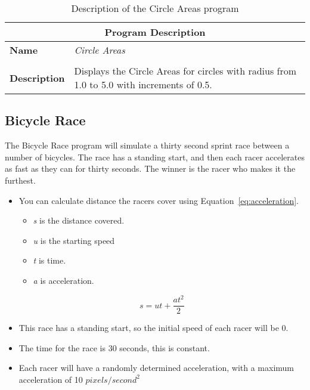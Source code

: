 \begin{table}[h]
\centering
\begin{tabular}{l|p{10cm}}
  \hline
  \multicolumn{2}{c}{\textbf{Program Description}} \\
  \hline
  \textbf{Name} & \emph{Circle Areas} \\
  \\
  \textbf{Description} & Displays the Circle Areas for circles with radius from 1.0 to 5.0 with increments of 0.5. \\
  \hline
\end{tabular}
\caption{Description of the Circle Areas program}
\label{tbl:data-circle-area}
\end{table}




\clearpage



\clearpage
\subsection{Bicycle Race} %
\label{sub:bicycle_race}

The Bicycle Race program will simulate a thirty second sprint race between a number of bicycles. The race has a standing start, and then each racer accelerates as fast as they can for thirty seconds. The winner is the racer who makes it the furthest.

\begin{itemize}
  \item You can calculate distance the racers cover using Equation~\ref{eq:acceleration}.
  \begin{itemize}
    \item \emph{s} is the distance covered.
    \item \emph{u} is the starting speed
    \item \emph{t} is time.
    \item \emph{a} is acceleration.
  \end{itemize} 
  \begin{equation}
    s = ut + \frac{a t^2}{2}
    \label{eq:acceleration}
  \end{equation}
  \item This race has a standing start, so the initial speed of each racer will be 0.
  \item The time for the race is 30 seconds, this is constant.
  \item Each racer will have a randomly determined acceleration, with a maximum acceleration of 10 $pixels/second^2$
\end{itemize}





